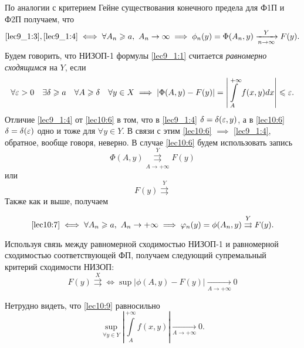 \documentclass[../../main.tex]{subfiles}
\begin{document}
По аналогии с критерием Гейне существования конечного предела для Ф1П и Ф2П 
получаем, что 
\[\eqref{lec9_1:3}, \eqref{lec9_1:4} \iff \forall A_n \ge 
a,\ A_n \to \infty \implies \phi_n(y) =\Phi(A_n,y) \xrightarrow[n\rightarrow 
\infty]{Y}F(y).\]
Будем говорить, что НИЗОП-1 формулы \eqref{lec9_1:1}  считается 
\emph{равномерно сходящимся} на $Y$, если
\begin{equation}
\label{lec10:6}
\forall \eps > 0\quad \exists \delta \ge a\quad \forall A \ge \delta\quad 
\forall y\in X 
\implies \left| \Phi(A,y) - F(y) \right| = \left| \int\limits_A^{+\infty} 
f(x,y) dx \right| \le \eps.
\end{equation}
Отличие \eqref{lec9_1:4} от \eqref{lec10:6} в том, что в \eqref{lec9_1:4} 
$\delta = 
\delta(\eps,y)$, а в \eqref{lec10:6} $\delta = \delta(\eps)$ одно и тоже для
$\forall y \in Y$. В связи с этим \eqref{lec10:6} $\implies$ \eqref{lec9_1:4}, 
обратное, вообще говоря, неверно. 
В случае \eqref{lec10:6} будем использовать запись \begin{equation}
\label{lec10:7}
\Phi(A,y)\overset{Y}{\underset{A \to +\infty}{\rightrightarrows}}F(y)
\end{equation}
или 
\begin{equation}
F(y)\overset{Y}{\rightrightarrows}
\end{equation}
Также как и выше, получаем 

\begin{thm}
\begin{equation}
\label{lec10:8}
 \eqref{lec10:7} \iff \forall A_n \ge a,\ A_n\rightarrow +\infty \implies 
 \varphi_n(y) = \phi(A_n,y) \overset{Y}\rightrightarrows F(y).
\end{equation}
\end{thm}
Используя связь между равномерной сходимостью НИЗОП-1 и равномерной 
сходимостью соответствующей ФП, получаем следующий супремальный критерий 
сходимости НИЗОП:
\begin{equation}
\label{lec10:9}
F(y)\overset{X} \rightrightarrows \iff \sup\left|\phi(A , y) - F(y) \right| 
\underset{A \to + \infty}\to 0 \end{equation}

Нетрудно видеть, что \eqref{lec10:9} равносильно
\begin{equation}
\label{lec10:10} \underset{\forall y \in 
Y}\sup\left|\int\limits_A^{+\infty} f(x,y)\right| \underset{A \to + \infty} 
\to 0. \end{equation}
\end{document}
